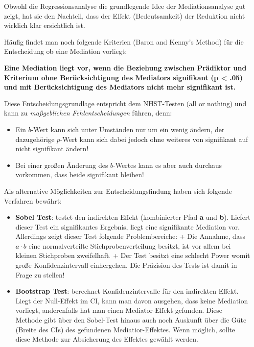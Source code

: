 \documentclass[]{article}
\providecommand{\tightlist}{%
  \setlength{\itemsep}{0pt}\setlength{\parskip}{0pt}}
\begin{document}
Obwohl die Regressionsanalyse die grundlegende Idee der Mediationsanalyse gut zeigt, hat sie den Nachteil, dass der Effekt (Bedeutsamkeit) der Reduktion nicht wirklich klar ersichtlich ist.

Häufig findet man noch folgende Kriterien (Baron and Kenny's Method) für die Entscheidung ob eine Mediation vorliegt:

\textbf{Eine Mediation liegt vor, wenn die Beziehung zwischen Prädiktor und Kriterium ohne Berücksichtigung des Mediators signifikant (p \textless{} .05) und mit Berücksichtigung des Mediators nicht mehr signifikant ist.}

Diese Entscheidungsgrundlage entspricht dem NHST-Testen (all or nothing) und kann zu \emph{maßgeblichen Fehlentscheidungen} führen, denn:

\begin{itemize}
\tightlist
\item
  Ein \(b\)-Wert kann sich unter Umständen nur um ein wenig ändern, der dazugehörige \(p\)-Wert kann sich dabei jedoch ohne weiteres von signifikant auf nicht signifikant ändern!
\item
  Bei einer großen Änderung des \(b\)-Wertes kann es aber auch durchaus vorkommen, dass beide signifikant bleiben!
\end{itemize}

Als alternative Möglichkeiten zur Entscheidungsfindung haben sich folgende Verfahren bewährt:

\begin{itemize}
\item
  \textbf{Sobel Test}: testet den indirekten Effekt (kombinierter Pfad \textbf{a} und \textbf{b}). Liefert dieser Test ein signifikantes Ergebnis, liegt eine signifikante Mediation vor. Allerdings zeigt dieser Test folgende Problembereiche:
  + Die Annahme, dass \(a \cdot b\) eine normalverteilte Stichprobenverteilung besitzt, ist vor allem bei kleinen Stichproben zweifelhaft.
  + Der Test besitzt eine schlecht Power womit große Konfidenzintervall einhergehen. Die Präzision des Tests ist damit in Frage zu stellen!
\item
  \textbf{Bootstrap Test}: berechnet Konfidenzintervalle für den indirekten Effekt. Liegt der Null-Effekt im CI, kann man davon ausgehen, dass keine Mediation vorliegt, anderenfalls hat man einen Mediator-Effekt gefunden. Diese Methode gibt über den Sobel-Test hinaus auch noch Auskunft über die Güte (Breite des CIs) des gefundenen Mediatior-Effektes. Wenn möglich, sollte diese Methode zur Absicherung des Effektes gewählt werden.
\end{itemize}
\end{document}
